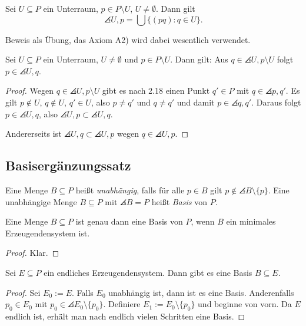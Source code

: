 \setcounter{thm}{17}
\begin{prp}
 Sei $U \subseteq P$ ein Unterraum, $p \in P \setminus U$, $U \ne \emptyset$. Dann gilt
 \[ \angles{ U,p } = \bigcup \{ (pq) : q \in U \}. \]
\end{prp}

Beweis als Übung, das Axiom A2) wird dabei wesentlich verwendet.

\begin{prp}[Austauschsatz]
 Sei $U \subseteq P$ ein Unterraum, $U \ne \emptyset$ und $p \in P \setminus U$. Dann gilt: Aus $q \in \angles{U,p} \setminus U$ folgt $p \in \angles{U,q}$.
\end{prp}

\begin{proof}
 Wegen $q \in \angles{U,p} \setminus U$ gibt es nach 2.18 einen Punkt $q' \in P$ mit $q \in \angles{p,q'}$. Es gilt $p \notin U$, $q \notin U$, $q' \in U$, also $p \ne q'$ und $q \ne q'$ und damit $p \in \angles{q,q'}$.  Daraus folgt $p \in \angles{U,q}$, also $\angles{U,p} \subset \angles{U,q}$.
 
 Andererseits ist $\angles{U,q} \subset \angles{U,p}$ wegen $q \in \angles{U,p}$.
\end{proof}

\subsection{Basisergänzungssatz}
\begin{defn*}
 Eine Menge $B \subseteq P$ heißt \emph{unabhängig}, falls für alle $p \in B$ gilt $p \notin \angles{ B \setminus \{ p\}}$. Eine unabhängige Menge $B \subseteq P$ mit $\angles{B} = P$ heißt \emph{Basis} von $P$.
\end{defn*}

\begin{prp}
 Eine Menge $B \subseteq P$ ist genau dann eine Basis von $P$, wenn $B$ ein minimales Erzeugendensystem ist.
\end{prp}

\begin{proof}
 Klar.
\end{proof}

\begin{prp}
 Sei $E \subseteq P$ ein endliches Erzeugendensystem. Dann gibt es eine Basis $B \subseteq E$.
\end{prp}

\begin{proof}
 Sei $E_0 := E$. Falls $E_0$ unabhängig ist, dann ist es eine Basis. Anderenfalls $p_0 \in E_0$ mit $p_0 \in \angles{E_0 \setminus \{ p_0 \}}$. Definiere $E_1 := E_0 \setminus \{ p_0 \}$ und beginne von vorn. Da $E$ endlich ist, erhält man nach endlich vielen Schritten eine Basis.
\end{proof}

